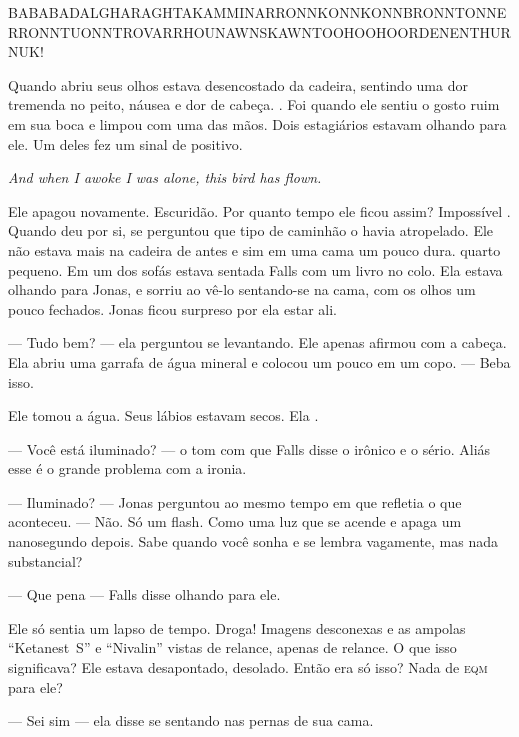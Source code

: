 \begin{sloppypar}
BA\-BA\-BA\-DAL\-GHA\-RA\-GH\-TA\-KAM\-MI\-NAR\-RON\-N\-KON\-N\-KON\-N\-BRON\-N\-TON\-NE\-R\-RON\-N\-TU\-ON\-N\-TRO\-VAR\-R\-HO\-UN\-AW\-NS\-KA\-WN\-TOO\-HOO\-HO\-OR\-DE\-NEN\-TH\-UR\-NUK!
\end{sloppypar}

Quando abriu seus olhos\mudanca{,} estava desencostado da cadeira, sentindo uma dor tremenda no peito, náusea e dor de cabeça. . Foi quando ele sentiu o gosto ruim em sua boca e limpou com uma das mãos. Dois estagiários estavam olhando para ele. Um deles fez um sinal de positivo.

\foreignlanguage{english}{\emph{And when I awoke I was alone, this bird has flown.}}

Ele apagou novamente. Escuridão. Por quanto tempo ele ficou assim? Impossível . Quando deu por si, se perguntou que tipo de caminhão o havia atropelado. Ele não estava mais na cadeira de antes e sim em uma cama um pouco dura.  quarto pequeno. Em um dos sofás estava sentada Falls\mudanca{,} com um livro no colo. Ela estava olhando para Jonas, e sorriu ao vê-lo sentando-se na cama, com os olhos um pouco fechados. Jonas ficou surpreso por ela estar ali.

--- Tudo bem? --- ela perguntou se levantando. Ele apenas afirmou com a cabeça. Ela abriu uma garrafa de água mineral e colocou um pouco em um copo. --- Beba isso.

Ele tomou a água. Seus lábios estavam secos. Ela .

--- Você está iluminado? --- o tom com que Falls disse o irônico e o sério. Aliás\mudanca{,} esse é o grande problema com a ironia.

--- Iluminado? --- Jonas perguntou ao mesmo tempo em que refletia o que aconteceu. --- Não. Só um flash. Como uma luz que se acende e apaga um nanosegundo depois. Sabe quando você sonha e se lembra vagamente, mas nada substancial?

--- Que pena --- Falls disse olhando para ele.

Ele só sentia um lapso de tempo. Droga! Imagens desconexas e as ampolas ``Ketanest~S'' e ``Nivalin'' vistas de relance, apenas de relance. O que isso significava? Ele estava desapontado, desolado. Então era só isso? Nada de \textsc{eqm} para ele?

--- Sei sim --- ela disse\mudanca{,} se sentando nas pernas de sua cama.

